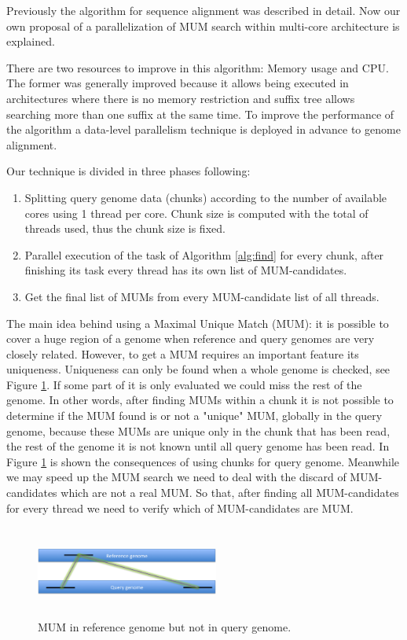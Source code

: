 \documentclass[conference]{IEEEtran}
\begin{document}
Previously the algorithm for sequence alignment was described in detail. Now our own proposal of a parallelization of MUM search within multi-core architecture is explained.

There are two resources to improve in this algorithm: Memory usage and CPU. The former was generally improved because it allows being executed in architectures where there is no memory restriction and suffix tree allows searching more than one suffix at the same time. To improve the performance of the algorithm a data-level parallelism technique is deployed in advance to genome alignment.

Our technique is divided in three phases following:
\begin{enumerate}
\item Splitting query genome data (chunks) according to the number of available cores using 1 thread per core. Chunk size is computed with the total of threads used, thus the chunk size is fixed.
\item Parallel execution of the task of Algorithm \ref{alg:find} for every chunk, after finishing its task every thread has its own list of MUM-candidates.
\item Get the final list of MUMs from every MUM-candidate list of all threads.
\end{enumerate}
The main idea behind using a Maximal Unique Match (MUM): it is possible to cover a huge region of a genome when reference and query genomes are very closely related. However, to get a MUM  requires an important feature its uniqueness. Uniqueness can only be found when a whole genome is checked, see Figure \ref{Whole-MUM}. If some part of it is only evaluated we could miss the rest of the genome. In other words, after finding MUMs within a chunk it is not possible to determine if the MUM found is or not a "unique" MUM, globally in the query genome,  because these MUMs are unique only in the chunk that has been read, the rest of the genome it is not known until all query genome has been read. In Figure \ref{Whole-MUM} is shown the consequences of using chunks for query genome. Meanwhile we may speed up the MUM search we need to deal with the discard of MUM-candidates which are not a real MUM. So that, after finding all MUM-candidates for every thread we need to verify which of MUM-candidates are MUM.

\begin{figure}[htb]  
\begin{center} 
  \includegraphics[width=6cm,height=3cm]{Whole-MUM.png}
\end{center} 
\caption{MUM in reference genome but not in query genome.} 
\label{Whole-MUM} 
\end{figure}
\end{document}
